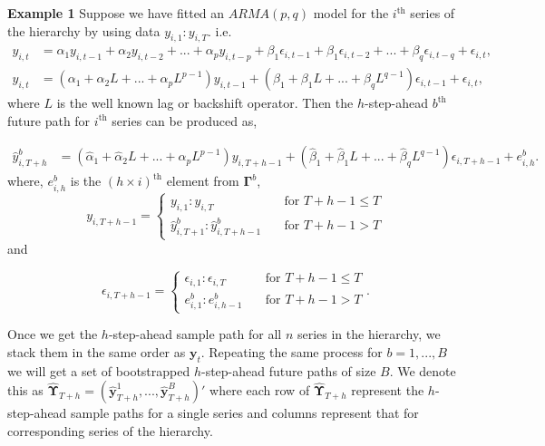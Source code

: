 \noindent
\textbf{Example 1}
Suppose we have fitted an $ARMA(p,q)$ model for the $i^\text{th}$ series of the hierarchy by using data $y_{i,1}:y_{i,T}$. i.e.
\begin{align*}
y_{i,t} &= \alpha_1y_{i,t-1} + \alpha_2y_{i,t-2}+...+\alpha_py_{i,t-p} + \beta_1\epsilon_{i,t-1} + \beta_1\epsilon_{i,t-2}+...+\beta_q\epsilon_{i,t-q} + \epsilon_{i,t},\\
y_{i,t} &= (\alpha_1 + \alpha_2L+...+\alpha_pL^{p-1})y_{i,t-1} + (\beta_1 + \beta_1L+...+\beta_qL^{q-1})\epsilon_{i,t-1} + \epsilon_{i,t},
\end{align*}
where $L$ is the well known lag or backshift operator. Then the $h$-step-ahead $b^\text{th}$ future path for $i^\text{th}$ series can be produced as,

\begin{align*}
\hat{y}^b_{i,T+h} &= (\hat{\alpha}_1 + \hat{\alpha}_2L +...+ \hat{\alpha}_pL^{p-1})y_{i,T+h-1} + (\hat{\beta}_1 + \hat{\beta}_1L+...+\hat{\beta}_qL^{q-1})\epsilon_{i,T+h-1} + e^b_{i,h}.
\end{align*}
where, $e^b_{i,h}$ is the $(h\times i)^\text{th}$ element from $\bm{\Gamma}^b$,
\begin{equation*}
y_{i,T+h-1} =
\begin{cases}
y_{i,1}:y_{i,T}       & \quad \text{for } T+h-1 \le T\\
\hat{y}^b_{i,T+1}:\hat{y}^b_{i,T+h-1}  & \quad \text{for } T+h-1 > T
\end{cases}
\end{equation*}
and 

\begin{equation*}
\epsilon_{i,T+h-1} =
\begin{cases}
\epsilon_{i,1}:\epsilon_{i,T}       & \quad \text{for } T+h-1 \le T\\
e^b_{i,1}:e^b_{i,h-1}  & \quad \text{for } T+h-1 > T
\end{cases}.
\end{equation*}

Once we get the $h$-step-ahead sample path for all $n$ series in the hierarchy, we stack them in the same order as $\bm{y}_t$. Repeating the same process for $b = 1,...,B$ we will get a set of bootstrapped $h$-step-ahead future paths of size $B$. We denote this as $\hat{\bm{\Upsilon}}_{T+h} = (\hat{\bm{y}}^1_{T+h},...,\hat{\bm{y}}^B_{T+h})'$ where each row of $\hat{\bm{\Upsilon}}_{T+h}$ represent the $h$-step-ahead sample paths for a single series and columns represent that for corresponding series of the hierarchy.  

